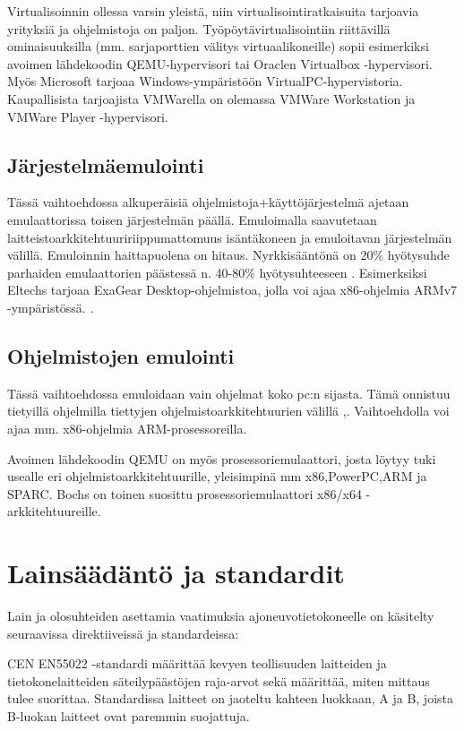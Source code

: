 \documentclass[11pt,a4paper,oneside,article]{memoir}
\begin{document}
Virtualisoinnin ollessa varsin yleistä, niin virtualisointiratkaisuita tarjoavia yrityksiä ja ohjelmistoja on paljon. Työpöytävirtualisointiin riittävillä ominaisuuksilla (mm. sarjaporttien välitys virtuaalikoneille) sopii esimerkiksi avoimen lähdekoodin QEMU-hypervisori tai Oraclen Virtualbox -hypervisori. Myös Microsoft tarjoaa Windows-ympäristöön VirtualPC-hypervistoria. Kaupallisista tarjoajista VMWarella on olemassa VMWare Workstation ja VMWare Player -hypervisori.

\section{Järjestelmäemulointi}

Tässä vaihtoehdossa alkuperäisiä ohjelmistoja+käyttöjärjestelmä ajetaan emulaattorissa toisen järjestelmän päällä. Emuloimalla saavutetaan laitteistoarkkitehtuuririippumattomuus isäntäkoneen ja emuloitavan järjestelmän välillä. Emuloinnin haittapuolena on hitaus. Nyrkkisääntönä on 20\% hyötysuhde \cite{tinycc} parhaiden emulaattorien päästessä n. 40-80\% hyötysuhteeseen \cite{40pperf}. Esimerksiksi Eltechs tarjoaa ExaGear Desktop-ohjelmistoa, jolla voi ajaa x86-ohjelmia ARMv7 -ympäristössä. \cite{eltechs:exagear}. 

\section{Ohjelmistojen emulointi}

Tässä vaihtoehdossa emuloidaan vain ohjelmat koko pc:n sijasta. Tämä onnistuu tietyillä ohjelmilla tiettyjen ohjelmistoarkkitehtuurien välillä \cite{tinycc},\cite{qemu_use}. Vaihtoehdolla voi ajaa mm. x86-ohjelmia ARM-prosessoreilla.

Avoimen lähdekoodin QEMU on myös prosessoriemulaattori, josta löytyy tuki usealle eri ohjelmistoarkkitehtuurille, yleisimpinä mm x86,PowerPC,ARM ja SPARC. Bochs on toinen suosittu prosessoriemulaattori x86/x64 -arkkitehtuureille.
\newpage

\chapter{Lainsäädäntö ja standardit}

Lain ja olosuhteiden asettamia vaatimuksia ajoneuvotietokoneelle on käsitelty seuraavissa direktiiveissä ja standardeissa:

CEN EN55022 -standardi määrittää kevyen teollisuuden laitteiden ja tietokonelaitteiden säteilypäästöjen raja-arvot sekä määrittää, miten mittaus tulee suorittaa. Standardissa laitteet on jaoteltu kahteen luokkaan, A ja B, joista B-luokan laitteet ovat paremmin suojattuja.\cite{EN55022}
\end{document}
